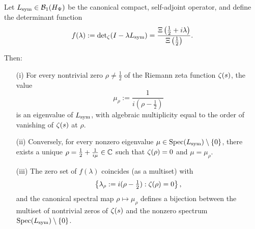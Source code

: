 \begin{lemma}
\label{lem:fredholm_zero_spectral_map}
Let \( L_{\mathrm{sym}} \in \mathcal{B}_1(H_{\Psi}) \) be the canonical compact, self-adjoint operator, and define the determinant function
\[
f(\lambda) := \det\nolimits_\zeta(I - \lambda L_{\mathrm{sym}}) = \frac{\Xi\left( \tfrac{1}{2} + i\lambda \right)}{\Xi\left( \tfrac{1}{2} \right)}.
\]

Then:
\begin{enumerate}
  \item[\textnormal{(i)}] For every nontrivial zero \( \rho \ne \tfrac{1}{2} \) of the Riemann zeta function \( \zeta(s) \), the value
  \[
  \mu_\rho := \frac{1}{i(\rho - \tfrac{1}{2})}
  \]
  is an eigenvalue of \( L_{\mathrm{sym}} \), with algebraic multiplicity equal to the order of vanishing of \( \zeta(s) \) at \( \rho \).

  \item[\textnormal{(ii)}] Conversely, for every nonzero eigenvalue \( \mu \in \operatorname{Spec}(L_{\mathrm{sym}}) \setminus \{0\} \), there exists a unique \( \rho = \tfrac{1}{2} + \frac{1}{i\mu} \in \mathbb{C} \) such that \( \zeta(\rho) = 0 \) and \( \mu = \mu_\rho \).

  \item[\textnormal{(iii)}] The zero set of \( f(\lambda) \) coincides (as a multiset) with
  \[
  \left\{ \lambda_\rho := i(\rho - \tfrac{1}{2}) : \zeta(\rho) = 0 \right\},
  \]
  and the canonical spectral map \( \rho \mapsto \mu_\rho \) defines a bijection between the multiset of nontrivial zeros of \( \zeta(s) \) and the nonzero spectrum \( \operatorname{Spec}(L_{\mathrm{sym}}) \setminus \{0\} \).
\end{enumerate}
\end{lemma}
